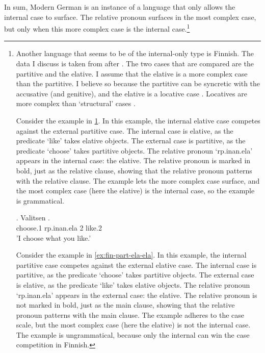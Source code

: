 In sum, Modern German is an instance of a language that only allows the internal case to surface. The relative pronoun surfaces in the most complex case, but only when this more complex case is the internal case.\footnote{
Another language that seems to be of the internal-only type is Finnish. The data I discuss is taken from \citet{bresnan1978} after \citet{carlson1977}.
The two cases that are compared are the partitive and the elative. I assume that the elative is a more complex case than the partitive. I believe so because the partitive can be syncretic with the accusative (and genitive), and the elative is a locative case \citep{karlsson2013}. Locatives are more complex than `structural' cases \citep[cf.]{caha2009}.

Consider the example in \ref{ex:fin-ela-part}. In this example, the internal elative case competes against the external partitive case.
The internal case is elative, as the predicate  `like' takes elative objects.
The external case is partitive, as the predicate  `choose' takes partitive objects.
The relative pronoun  `\ac{rp}.\ac{inan}.\ac{ela}' appears in the internal case: the elative. The relative pronoun is marked in bold, just as the relative clause, showing that the relative pronoun patterns with the relative clause.
The example lets the more complex case surface, and the most complex case (here the elative) is the internal case, so the example is grammatical.

\exg. Valitsen   .\\
choose.1\scsub{[part]} \ac{rp}.\ac{inan}.\ac{ela} 2 like.2\scsub{[ela]}\\
'I choose what you like.' \label{ex:fin-ela-part}

Consider the example in \ref{ex:fin-part-ela-ela}. In this example, the internal partitive case competes against the external elative case.
The internal case is partitive, as the predicate  `choose' takes partitive objects.
The external case is elative, as the predicate  `like' takes elative objects.
The relative pronoun  `\ac{rp}.\ac{inan}.\ac{ela}' appears in the external case: the elative. The relative pronoun is not marked in bold, just as the main clause, showing that the relative pronoun patterns with the main clause.
The example adheres to the case scale, but the most complex case (here the elative) is not the internal case. The example is ungrammatical, because only the internal can win the case competition in Finnish.

}
